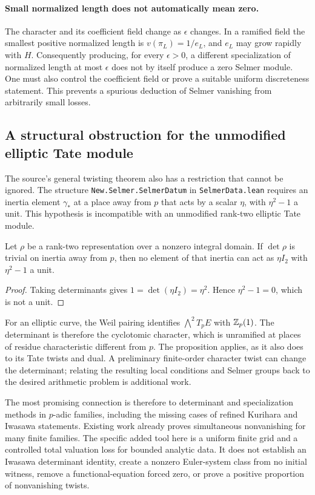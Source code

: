 \paragraph{Small normalized length does not automatically mean zero.}
The character and its coefficient field change as $\epsilon$ changes.
In a ramified field the smallest positive normalized length is
$v(\pi_L)=1/e_L$, and $e_L$ may grow rapidly with $H$. Consequently
producing, for every $\epsilon>0$, a different specialization of
normalized length at most $\epsilon$ does not by itself produce a
zero Selmer module. One must also control the coefficient field or
prove a suitable uniform discreteness statement. This prevents a
spurious deduction of Selmer vanishing from arbitrarily small losses.

\subsection{A structural obstruction for the unmodified elliptic Tate module}

The source's general twisting theorem also has a restriction that
cannot be ignored. The structure \texttt{New.Selmer.SelmerDatum} in
\texttt{SelmerData.lean} requires an inertia element $\gamma_*$ at a
place away from $p$ that acts by a scalar $\eta$, with
$\eta^2-1$ a unit. This hypothesis is incompatible with an unmodified
rank-two elliptic Tate module.

\begin{proposition}
\label{prop:scalar-inertia-obstruction}
Let $\rho$ be a rank-two representation over a nonzero integral
domain. If $\det\rho$ is trivial on inertia away from $p$, then no
element of that inertia can act as $\eta I_2$ with $\eta^2-1$ a unit.
\end{proposition}

\begin{proof}
Taking determinants gives $1=\det(\eta I_2)=\eta^2$.
Hence $\eta^2-1=0$, which is not a unit.
\end{proof}

For an elliptic curve, the Weil pairing identifies
$\bigwedge^2T_pE$ with $\mathbb Z_p(1)$. The determinant is therefore the
cyclotomic character, which is unramified at places of residue
characteristic different from $p$. The proposition applies, as it
also does to its Tate twists and dual. A preliminary finite-order
character twist can change the determinant; relating the resulting
local conditions and Selmer groups back to the desired arithmetic
problem is additional work.

The most promising connection is therefore to determinant and
specialization methods in $p$-adic families, including the missing
cases of refined Kurihara and Iwasawa statements. Existing work already
proves simultaneous nonvanishing for many finite families. The
specific added tool here is a uniform finite grid and a controlled
total valuation loss for bounded analytic data. It does not establish
an Iwasawa determinant identity, create a nonzero Euler-system class
from no initial witness, remove a functional-equation forced zero, or
prove a positive proportion of nonvanishing twists.
